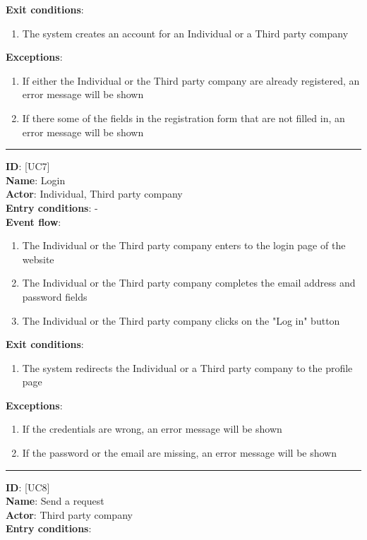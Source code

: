 \documentclass[a4paper, hidelinks, 12pt]{report}
\newcommand\usecase[1]{ [UC#1] }
\begin{document}
\begin{itemize}
\begin{enumerate}
		\end{enumerate}
		\textbf{Exit conditions}:
		\begin{enumerate}
			\item{The system creates an account for an Individual or a Third party company}
		\end{enumerate}
		\textbf{Exceptions}:
		\begin{enumerate}
			\item{If either the Individual or the Third party company are already registered, an error message will be shown}
			\item{If there some of the fields in the registration form that are not filled in, an error message will be shown}
		\end{enumerate}
		\rule{\linewidth}{0.4pt}
		\textbf{ID}: \usecase{7} \\
		\textbf{Name}: Login \\
		\textbf{Actor}: Individual, Third party company \\
		\textbf{Entry conditions}: - \\
		\textbf{Event flow}:
		\begin{enumerate}
			\item{The Individual or the Third party company enters to the login page of the website}
			\item{The Individual or the Third party company completes the email address and password fields}
			\item{The Individual or the Third party company clicks on the "Log in" button}
		\end{enumerate}
		\textbf{Exit conditions}:
		\begin{enumerate}
			\item{The system redirects the Individual or a Third party company to the profile page}
		\end{enumerate}
		\textbf{Exceptions}:
		\begin{enumerate}
			\item{If the credentials are wrong, an error message will be shown}
			\item{If the password or the email are missing, an error message will be shown}
		\end{enumerate}
		\rule{\linewidth}{0.4pt}
		\textbf{ID}: \usecase{8} \\
		\textbf{Name}: Send a request \\
		\textbf{Actor}: Third party company \\
		\textbf{Entry conditions}:
		\begin{enumerate}

\end{enumerate}
\end{itemize}
\end{document}
